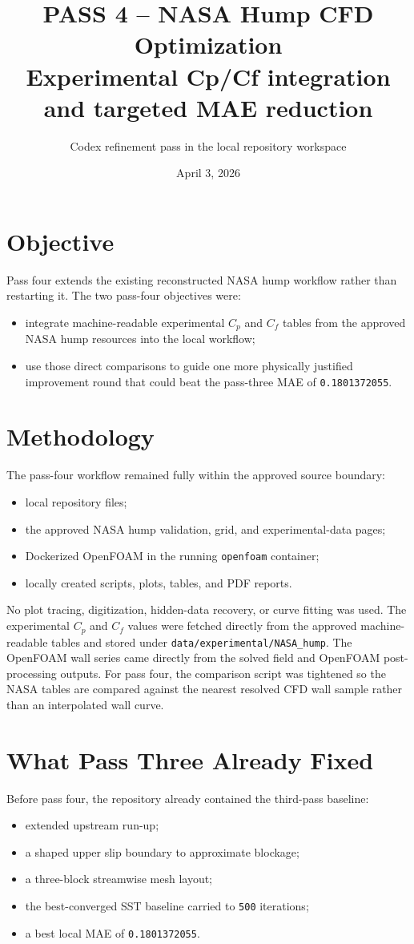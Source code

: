 \documentclass[11pt]{article}
\title{PASS 4 -- NASA Hump CFD Optimization\\\large Experimental Cp/Cf integration and targeted MAE reduction}
\author{Codex refinement pass in the local repository workspace}
\date{April 3, 2026}
\begin{document}
\setlength{\emergencystretch}{3em}
\maketitle

\section{Objective}
Pass four extends the existing reconstructed NASA hump workflow rather than restarting it. The two pass-four objectives were:
\begin{itemize}
\item integrate machine-readable experimental \(C_p\) and \(C_f\) tables from the approved NASA hump resources into the local workflow;
\item use those direct comparisons to guide one more physically justified improvement round that could beat the pass-three MAE of \texttt{0.1801372055}.
\end{itemize}

\section{Methodology}
The pass-four workflow remained fully within the approved source boundary:
\begin{itemize}
\item local repository files;
\item the approved NASA hump validation, grid, and experimental-data pages;
\item Dockerized OpenFOAM in the running \texttt{openfoam} container;
\item locally created scripts, plots, tables, and PDF reports.
\end{itemize}

No plot tracing, digitization, hidden-data recovery, or curve fitting was used. The experimental \(C_p\) and \(C_f\) values were fetched directly from the approved machine-readable tables and stored under \texttt{data/experimental/NASA\_hump}. The OpenFOAM wall series came directly from the solved field and OpenFOAM post-processing outputs. For pass four, the comparison script was tightened so the NASA tables are compared against the nearest resolved CFD wall sample rather than an interpolated wall curve.

\section{What Pass Three Already Fixed}
Before pass four, the repository already contained the third-pass baseline:
\begin{itemize}
\item extended upstream run-up;
\item a shaped upper slip boundary to approximate blockage;
\item a three-block streamwise mesh layout;
\item the best-converged SST baseline carried to \texttt{500} iterations;
\item a best local MAE of \texttt{0.1801372055}.
\end{itemize}
\end{document}
